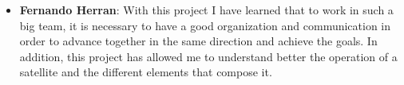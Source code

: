 {\begin{itemize}
 
\item \textbf{Fernando Herran}: With this project I have learned that to work in such a big team, it is necessary to have a good organization and communication in order to advance together in the same direction and  achieve the goals. In addition, this project has allowed me to understand better the operation of a satellite and the different elements that compose it.
\end{itemize}
}